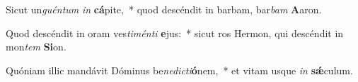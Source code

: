 \item Sicut un\textit{guén}\textit{tum} \textit{in} \textbf{cá}pite,~* quod descéndit in barbam, bar\textit{bam} \textbf{A}aron.
\item Quod descéndit in oram ves\textit{ti}\textit{mén}\textit{ti} \textbf{e}jus:~* sicut ros Hermon, qui descéndit in mon\textit{tem} \textbf{Si}on.
\item Quóniam illic mandávit Dóminus be\textit{ne}\textit{dic}\textit{ti}\textbf{ó}nem,~* et vitam usque \textit{in} \textbf{sǽ}culum.
